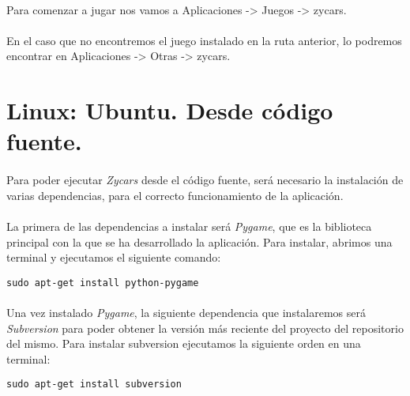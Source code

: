 \paragraph{}
Para comenzar a jugar nos vamos a Aplicaciones -> Juegos -> zycars.

\paragraph{}
En el caso que no encontremos el juego instalado en la ruta anterior, lo podremos encontrar en Aplicaciones -> Otras -> zycars.

\section{Linux: Ubuntu. Desde código fuente.}

\paragraph{}
Para poder ejecutar \emph{Zycars} desde el código fuente, será necesario la instalación de varias
dependencias, para el correcto funcionamiento de la aplicación.

\paragraph{}
La primera de las dependencias a instalar será \emph{Pygame}, que es la biblioteca principal con la que
se ha desarrollado la aplicación. Para instalar, abrimos una terminal y ejecutamos el siguiente comando:

\begin{lstlisting}[style=consola, numbers=none]
sudo apt-get install python-pygame
\end{lstlisting}

\paragraph{}
Una vez instalado \emph{Pygame}, la siguiente dependencia que instalaremos será \emph{Subversion} para poder
obtener la versión más reciente del proyecto del repositorio del mismo. Para instalar subversion ejecutamos 
la siguiente orden en una terminal:

\begin{lstlisting}[style=consola, numbers=none]
sudo apt-get install subversion
\end{lstlisting}

